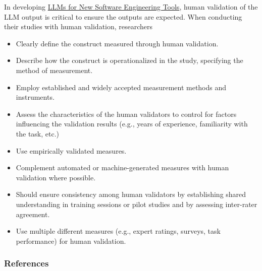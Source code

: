 In developing \href{/study-types/#llms-for-new-software-engineering-tools}{LLMs for New Software Engineering Tools}, human validation of the LLM output is critical to ensure the outputs are expected.
When conducting their studies with human validation, researchers

\must
\begin{itemize}
    \item Clearly define the construct measured through human validation.
    \item Describe how the construct is operationalized in the study, specifying the method of measurement.
    \item Employ established and widely accepted measurement methods and instruments.
\end{itemize}

\should
\begin{itemize}
    \item Assess the characteristics of the human validators to control for factors influencing the validation results (e.g., years of experience, familiarity with the task, etc.)
    \item Use empirically validated measures.
    \item Complement automated or machine-generated measures with human validation where possible.
    \item Should ensure consistency among human validators by establishing shared understanding in training sessions or pilot studies and by assessing inter-rater agreement.
\end{itemize}

\may
\begin{itemize}
    \item Use multiple different measures (e.g., expert ratings, surveys, task performance) for human validation.
\end{itemize}

\subsubsection{References}





